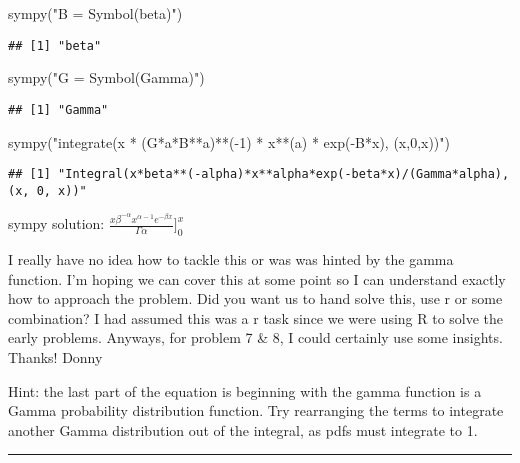 \documentclass[
]{article}
\newenvironment{Shaded}{\begin{snugshade}}{\end{snugshade}}
\newcommand{\FunctionTok}[1]{\textcolor[rgb]{0.00,0.00,0.00}{#1}}
\newcommand{\NormalTok}[1]{#1}
\newcommand{\StringTok}[1]{\textcolor[rgb]{0.31,0.60,0.02}{#1}}
\begin{document}
\begin{Shaded}
\begin{Highlighting}[]
\FunctionTok{sympy}\NormalTok{(}\StringTok{"B = Symbol(\textquotesingle{}beta\textquotesingle{})"}\NormalTok{)}
\end{Highlighting}
\end{Shaded}

\begin{verbatim}
## [1] "beta"
\end{verbatim}

\begin{Shaded}
\begin{Highlighting}[]
\FunctionTok{sympy}\NormalTok{(}\StringTok{"G = Symbol(\textquotesingle{}Gamma\textquotesingle{})"}\NormalTok{)}
\end{Highlighting}
\end{Shaded}

\begin{verbatim}
## [1] "Gamma"
\end{verbatim}

\begin{Shaded}
\begin{Highlighting}[]
\FunctionTok{sympy}\NormalTok{(}\StringTok{"integrate(x * (G*a*B**a)**({-}1) * x**(a) * exp({-}B*x), (x,0,x))"}\NormalTok{)}
\end{Highlighting}
\end{Shaded}

\begin{verbatim}
## [1] "Integral(x*beta**(-alpha)*x**alpha*exp(-beta*x)/(Gamma*alpha), (x, 0, x))"
\end{verbatim}

sympy solution:
\(\frac{x \beta^{-\alpha}x^{\alpha-1}e^{-\beta x}}{\Gamma \alpha}]_0^x\)

I really have no idea how to tackle this or was was hinted by the gamma
function. I'm hoping we can cover this at some point so I can understand
exactly how to approach the problem. Did you want us to hand solve this,
use r or some combination? I had assumed this was a r task since we were
using R to solve the early problems. Anyways, for problem 7 \& 8, I
could certainly use some insights. Thanks! Donny

Hint: the last part of the equation is beginning with the gamma function
is a Gamma probability distribution function. Try rearranging the terms
to integrate another Gamma distribution out of the integral, as pdfs
must integrate to 1.

\begin{center}\rule{0.5\linewidth}{0.5pt}\end{center}
\end{document}
